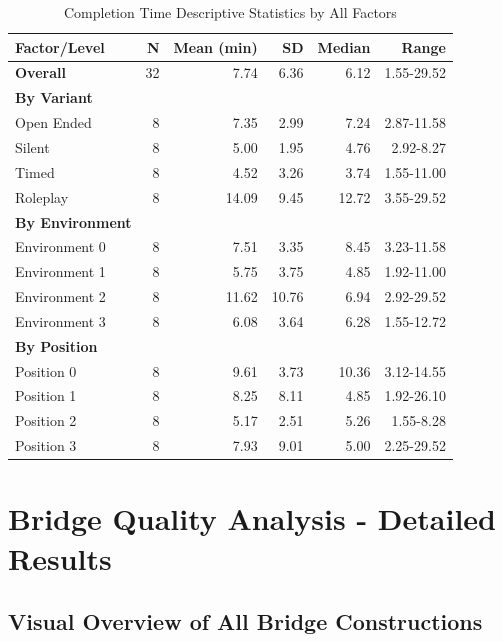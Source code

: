 \begin{table}[H]
\centering
\caption{Completion Time Descriptive Statistics by All Factors}
\label{tab:completion_time_complete_stats}
\begin{tabular}{lrrrrr}
\toprule
\textbf{Factor/Level} & \textbf{N} & \textbf{Mean (min)} & \textbf{SD} & \textbf{Median} & \textbf{Range} \\
\midrule
\textbf{Overall} & 32 & 7.74 & 6.36 & 6.12 & 1.55-29.52 \\
\midrule
\textbf{By Variant} & & & & & \\
Open Ended & 8 & 7.35 & 2.99 & 7.24 & 2.87-11.58 \\
Silent & 8 & 5.00 & 1.95 & 4.76 & 2.92-8.27 \\
Timed & 8 & 4.52 & 3.26 & 3.74 & 1.55-11.00 \\
Roleplay & 8 & 14.09 & 9.45 & 12.72 & 3.55-29.52 \\
\midrule
\textbf{By Environment} & & & & & \\
Environment 0 & 8 & 7.51 & 3.35 & 8.45 & 3.23-11.58 \\
Environment 1 & 8 & 5.75 & 3.75 & 4.85 & 1.92-11.00 \\
Environment 2 & 8 & 11.62 & 10.76 & 6.94 & 2.92-29.52 \\
Environment 3 & 8 & 6.08 & 3.64 & 6.28 & 1.55-12.72 \\
\midrule
\textbf{By Position} & & & & & \\
Position 0 & 8 & 9.61 & 3.73 & 10.36 & 3.12-14.55 \\
Position 1 & 8 & 8.25 & 8.11 & 4.85 & 1.92-26.10 \\
Position 2 & 8 & 5.17 & 2.51 & 5.26 & 1.55-8.28 \\
Position 3 & 8 & 7.93 & 9.01 & 5.00 & 2.25-29.52 \\
\bottomrule
\end{tabular}
\end{table}

\section{Bridge Quality Analysis - Detailed Results}
\label{appendix:bridge_quality_results}

\subsection{Visual Overview of All Bridge Constructions}

